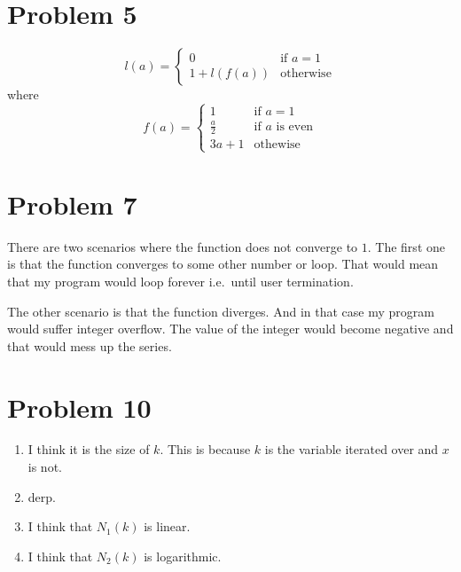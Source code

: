 \documentclass{article}
\begin{document}
\section{Problem 5}
$$
    l(a) =
    \begin{cases}
        0           & \text{if } a = 1 \\
        1 + l(f(a)) & \text{otherwise}
    \end{cases}
$$
where
$$
    f(a) =
    \begin{cases}
        1         & \text{if } a = 1 \\
        \frac a 2 & \text{if } a \text{ is even} \\
        3a + 1    & \text{othewise}
    \end{cases}
$$

\section{Problem 7}
There are two scenarios where the function does not converge to $1$. The first
one is that the function converges to some other number or loop. That would mean
that my program would loop forever i.e.\ until user termination.

The other scenario is that the function diverges. And in that case my program
would suffer integer overflow. The value of the integer would become negative
and that would mess up the series.

\section{Problem 10}
\begin{enumerate}
    \item I think it is the size of $k$. This is because $k$ is the variable
        iterated over and $x$ is not.
    \item derp.
    \item I think that $N_1(k)$ is linear.
    \item I think that $N_2(k)$ is logarithmic.
\end{enumerate}
\end{document}
